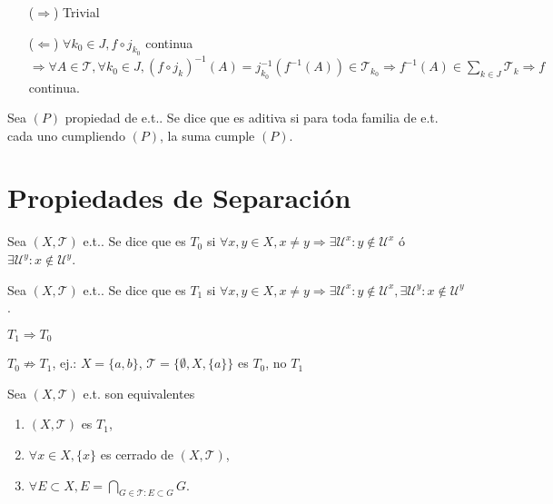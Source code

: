\begin{dem}
  \begin{enumerate}[label=(\roman*)]
    \item [($\Rightarrow$)] Trivial
    \item [($\Leftarrow$)] $\forall k_{0} \in J, f \circ j_{k_{0}}$ continua $\Rightarrow \forall A \in \mathcal{T}, \forall k_{0} \in J, (f \circ j_{k})^{-1}(A) = j_{k_{0}}^{-1}(f^{-1}(A)) \in \mathcal{T}_{k_{0}} \Rightarrow f^{-1}(A) \in \sum_{ k \in J } \mathcal{T}_{k} \Rightarrow f$ continua.
  \end{enumerate}
\end{dem}

\begin{defn}
  Sea $(P)$ propiedad de e.t.. Se dice que es aditiva si para toda familia de e.t. cada uno cumpliendo $(P)$, la suma cumple $(P)$.
\end{defn}

\chapter{Propiedades de Separación}

\begin{defn}
  Sea $( X, \mathcal{T} )$ e.t.. Se dice que es $T_{0}$ si $\forall x, y \in X, x \neq y \Rightarrow \exists \mathcal{U}^{x} : y \not \in \mathcal{U}^{x} $ ó $ \exists \mathcal{U}^{y} : x \not \in \mathcal{U}^{y}$.
\end{defn}

\begin{defn}
  Sea $( X, \mathcal{T} )$ e.t.. Se dice que es $T_{1}$ si $ \forall x, y \in X, x \neq y \Rightarrow \exists \mathcal{U}^{x}: y \not \in \mathcal{U}^{x}, \exists \mathcal{U}^{y}: x \not \in \mathcal{U}^{y}$.
\end{defn}

\begin{obs}
  $T_{1} \Rightarrow T_{0}$
\end{obs}

\begin{obs}
  $T_{0} \not \Rightarrow T_{1}$, ej.: $X = \{ a, b \}$, $\mathcal{T} = \{ \emptyset, X, \{ a \} \}$ es $T_{0}$, no $T_{1}$
\end{obs}

\begin{prop}
  Sea $( X, \mathcal{T} )$ e.t. son equivalentes
  \begin{enumerate}[label=(\roman*)]
    \item $( X, \mathcal{T} )$ es $T_{1}$,
    \item $\forall x \in X, \{ x \}$ es cerrado de $( X, \mathcal{T} )$,
    \item $\forall E \subset X, E = \bigcap_{G \in \mathcal{T}: E \subset G} G$.
  \end{enumerate}
\end{prop}

